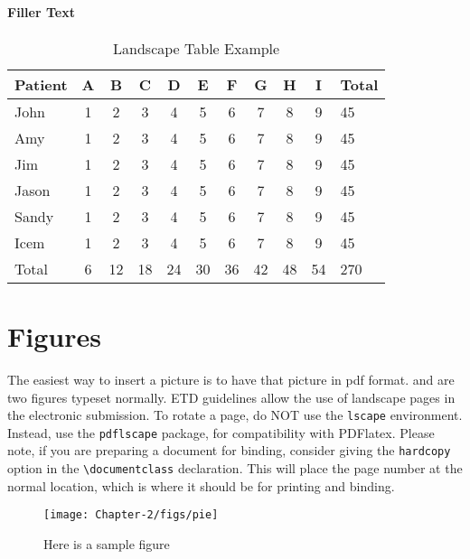 \paragraph{Filler Text} \lipsum[1-2]
\thispagestyle{lscapedplain}
\begin{landscape}
\begin{table}
\caption{Landscape Table Example}
\label{tab:two}
\begin{center}
\begin{tabular}{lcccccccccl}
\toprule
Patient & A & B & C & D & E & F & G & H &I & Total \\
\midrule
John & 1 & 2 & 3 & 4 & 5 & 6 & 7 & 8 & 9 & 45 \\
Amy & 1 & 2 & 3 & 4 & 5 & 6 & 7 & 8 & 9 & 45 \\
Jim & 1 & 2 & 3 & 4 & 5 & 6 & 7 & 8 & 9 & 45 \\
Jason & 1 & 2 & 3 & 4 & 5 & 6 & 7 & 8 & 9 & 45 \\
Sandy & 1 & 2 & 3 & 4 & 5 & 6 & 7 & 8 & 9 & 45 \\
Icem & 1 & 2 & 3 & 4 & 5 & 6 & 7 & 8 & 9 & 45 \\
\midrule
Total & 6 & 12 & 18 & 24 & 30 & 36 & 42 & 48 & 54 & 270\\
\bottomrule
\end{tabular}
\end{center}
\end{table}
\end{landscape}
\restoregeometry
\pagestyle{plain}
\thispagestyle{plain}


\section{Figures}

The easiest way to insert a picture is to have that picture in pdf format.  
 and  are two figures typeset normally.
ETD guidelines allow the use of landscape pages in the electronic 
submission.  To rotate a page, do NOT use the \texttt{lscape} environment. Instead, use the \texttt{pdflscape} package, for compatibility with PDFlatex.
Please note, if you are preparing a document for binding, consider
giving the \texttt{hardcopy} option in the \verb|\documentclass|
declaration.  This will place the page number at the normal location,
which is where it should be for printing and binding.
%
\begin{figure}[hbtp]
\centering
\texttt{[image: Chapter-2/figs/pie]}
\caption{Here is a sample figure}
\label{fig:hist1}
\end{figure}

